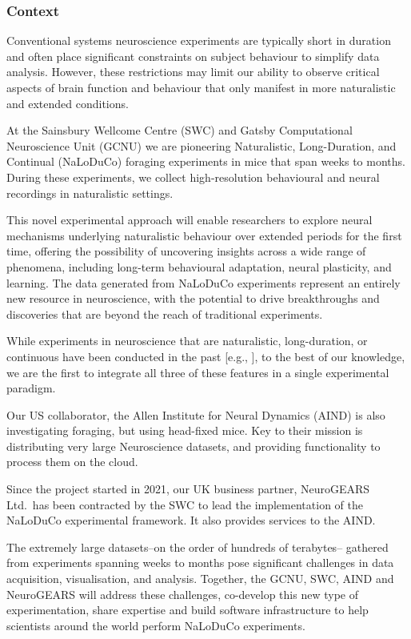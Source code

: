 \subsubsection{Context}

Conventional systems neuroscience experiments are typically short in duration
and often place significant constraints on subject behaviour to simplify data
analysis.
%
However, these restrictions may limit our ability to observe critical
aspects of brain function and behaviour that only manifest in more naturalistic
and extended conditions.

At the Sainsbury Wellcome Centre (SWC) and Gatsby Computational Neuroscience
Unit (GCNU) we are pioneering Naturalistic, Long-Duration, and Continual
(NaLoDuCo) foraging experiments in mice that span weeks to months. During these
experiments, we collect high-resolution behavioural and neural recordings in
naturalistic settings.

This novel experimental approach will enable researchers to explore neural
mechanisms underlying naturalistic behaviour over extended periods for the first
time, offering the possibility of uncovering insights across a wide range of
phenomena, including long-term behavioural adaptation, neural plasticity, and
learning.
%
The data generated from NaLoDuCo experiments represent an entirely new resource
in neuroscience, with the potential to drive breakthroughs and discoveries that
are beyond the reach of traditional experiments.

While experiments in neuroscience that are naturalistic, long-duration, or
continuous have been conducted in the past
[e.g., \cite{jhuangEtAl10,maoEtAl21,volohEtAl23}], to the best of our
knowledge, we are the first to integrate all three of these features in a
single experimental paradigm.

Our US collaborator, the Allen Institute for Neural Dynamics (AIND) is also investigating
foraging, but using head-fixed mice. Key to their mission is distributing very large Neuroscience datasets,
and providing functionality to process them on the cloud.

Since the project started in 2021, our UK business partner, NeuroGEARS Ltd.\ 
has been contracted by the SWC to lead the implementation of the NaLoDuCo
experimental framework. It also provides services to the AIND.

The extremely large datasets--on the order of hundreds of terabytes-- gathered
from experiments spanning weeks to months pose significant challenges in data
acquisition, visualisation, and analysis.
%
Together, the GCNU, SWC, AIND and NeuroGEARS will address these challenges,
co-develop this new type of experimentation, share expertise and build software
infrastructure to help scientists around the world perform NaLoDuCo
experiments.

